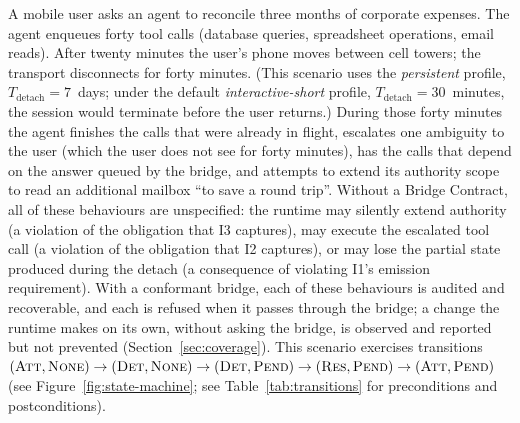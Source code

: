 \begin{example}
A mobile user asks an agent to reconcile three months of corporate
expenses. The agent enqueues forty tool calls (database queries,
spreadsheet operations, email reads). After twenty minutes the user's
phone moves between cell towers; the transport disconnects for forty
minutes. (This scenario uses the \emph{persistent} profile,
$T_{\text{detach}} = 7$~days; under the default
\emph{interactive-short} profile, $T_{\text{detach}} = 30$~minutes,
the session would terminate before the user returns.)
During those forty minutes the agent finishes the calls that
were already in flight, escalates one
ambiguity to the user (which the user does not see for forty minutes),
has the calls that depend on the answer queued by the bridge,
and attempts to extend its authority scope to read an additional mailbox
``to save a round trip''. Without a Bridge Contract, all of these
behaviours are unspecified: the runtime may silently extend authority
(a violation of the obligation that I3 captures), may execute the
escalated tool call (a violation of the obligation that I2 captures),
or may lose the partial state produced during the detach (a consequence
of violating I1's emission requirement). With a conformant bridge,
each of these behaviours is audited and recoverable, and each is
refused when it passes through the bridge; a change the runtime makes
on its own, without asking the bridge, is observed and reported but not
prevented (Section~\ref{sec:coverage}).
This scenario exercises transitions
$(\textsc{Att},\textsc{None}) \to (\textsc{Det},\textsc{None}) \to
(\textsc{Det},\textsc{Pend}) \to (\textsc{Res},\textsc{Pend}) \to
(\textsc{Att},\textsc{Pend})$ (see Figure~\ref{fig:state-machine}; see
Table~\ref{tab:transitions} for preconditions and postconditions).
\end{example}

